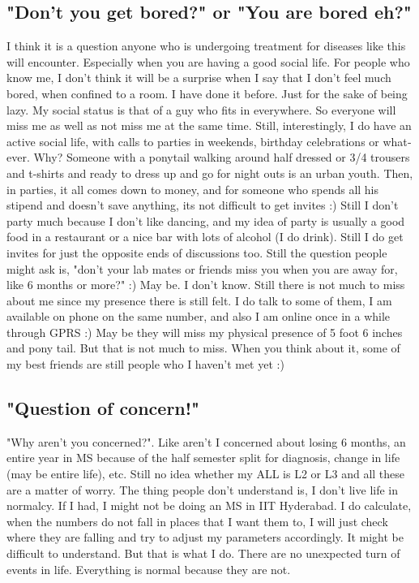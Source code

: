 \begin{english}
\subsection*{"Don't you get bored?" or "You are bored eh?"} 

I think it is a question anyone who is undergoing treatment for diseases like this will encounter. 
Especially when you are having a good social life. For people who know me, I don't think it
will be a surprise when I say that I don't feel much bored, when confined to a room. I have done it before.
Just for the sake of being lazy. My social status is that of a guy who fits in everywhere. So 
everyone will miss me as well as not miss me at the same time. Still, interestingly, I do have an active
social life, with calls to parties in weekends, birthday celebrations or whatever. Why? Someone
with a ponytail walking around half dressed or 3/4 trousers and t-shirts and ready to dress up and 
go for night outs is an urban youth. Then, in parties, it all comes down to money, and for 
someone who spends all his stipend and doesn't save anything, its not difficult to get invites
:) Still I don't party much because I don't like dancing, and my idea of party is usually a good
food in a restaurant or a nice bar with lots of alcohol (I do drink). Still I do get invites
for just the opposite ends of discussions too. Still the question people might ask is, "don't
your lab mates or friends miss you when you are away for, like 6 months or more?" :) May be. I don't
know. Still there is not much to miss about me since my presence there is still felt. I do
talk to some of them, I am available on phone on the same number, and also I am online once in a while
through GPRS :) May be they will miss my physical presence of 5 foot 6 inches and pony tail. But
that is not much to miss. When you think about it, some of my best friends are still people who I
haven't met yet :) 

\subsection*{"Question of concern!"} 

"Why aren't you concerned?". Like aren't I concerned about losing 6 months, an entire year in MS because of the half 
semester split for diagnosis, change in life (may be entire life), etc. Still no idea whether my
ALL is L2 or L3 and all these are a matter of worry. The thing people don't understand is, I 
don't live life in normalcy. If I had, I might not be doing an MS in IIT Hyderabad. I do 
calculate, when the numbers do not fall in places that I want them to, I will just check where they are 
falling and try to adjust my parameters accordingly. It might be difficult to understand. But
that is what I do. There are no unexpected turn of events in life. Everything is normal because
they are not.


\end{english}

